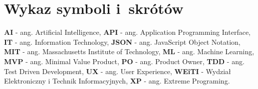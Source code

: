 \chapter*{Wykaz symboli i~skrótów}

\noindent
\textbf{AI} - ang. Artificial Intelligence, \newline
\textbf{API} - ang. Application Programming Interface, \newline
\textbf{IT} - ang. Information Technology, \newline
\textbf{JSON} - ang. JavaScript Object Notation, \newline
\textbf{MIT} - ang. Massachusetts Institute of Technology, \newline
\textbf{ML} - ang. Machine Learning, \newline
\textbf{MVP} - ang. Minimal Value Product, \newline
\textbf{PO} - ang. Product Owner, \newline
\textbf{TDD} - ang. Test Driven Development, \newline
\textbf{UX} - ang. User Experience, \newline
\textbf{WEiTI} - Wydział Elektroniczny i Technik Informacyjnych, \newline
\textbf{XP} - ang. Extreme Programing. \newline

\cleardoublepage